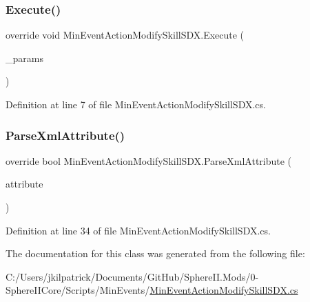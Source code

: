 \subsubsection{\texorpdfstring{Execute()}{Execute()}}
{\footnotesize\ttfamily override void Min\+Event\+Action\+Modify\+Skill\+S\+D\+X.\+Execute (\begin{DoxyParamCaption}\item[{Min\+Event\+Params}]{\+\_\+params }\end{DoxyParamCaption})}



Definition at line 7 of file Min\+Event\+Action\+Modify\+Skill\+S\+D\+X.\+cs.

\mbox{\label{class_min_event_action_modify_skill_s_d_x_a2f8c470805a87d707487c261bd641ded}} 
\subsubsection{\texorpdfstring{ParseXmlAttribute()}{ParseXmlAttribute()}}
{\footnotesize\ttfamily override bool Min\+Event\+Action\+Modify\+Skill\+S\+D\+X.\+Parse\+Xml\+Attribute (\begin{DoxyParamCaption}\item[{Xml\+Attribute}]{attribute }\end{DoxyParamCaption})}



Definition at line 34 of file Min\+Event\+Action\+Modify\+Skill\+S\+D\+X.\+cs.



The documentation for this class was generated from the following file\+:\begin{DoxyCompactItemize}
\item 
C\+:/\+Users/jkilpatrick/\+Documents/\+Git\+Hub/\+Sphere\+I\+I.\+Mods/0-\/\+Sphere\+I\+I\+Core/\+Scripts/\+Min\+Events/\mbox{\hyperlink{_min_event_action_modify_skill_s_d_x_8cs}{Min\+Event\+Action\+Modify\+Skill\+S\+D\+X.\+cs}}\end{DoxyCompactItemize}
